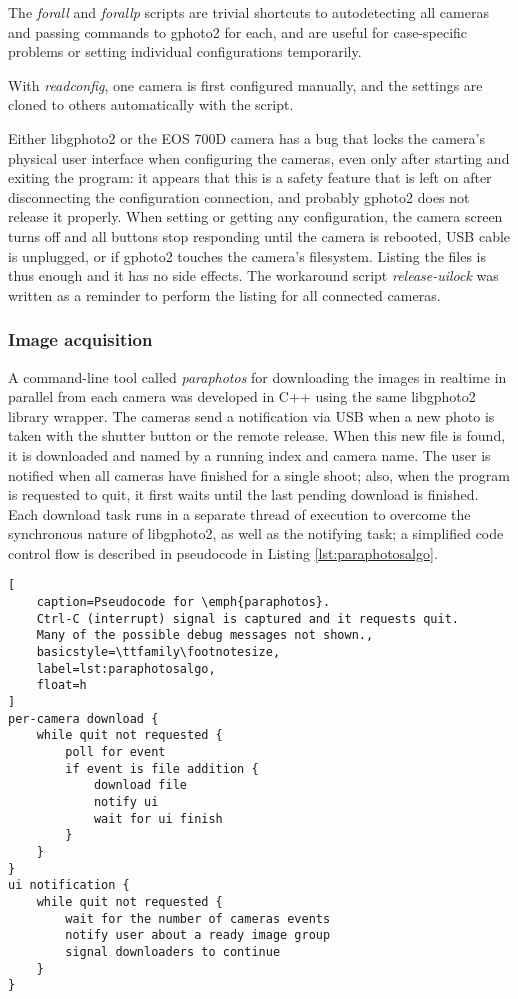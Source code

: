 The \emph{forall} and \emph{forallp} scripts are trivial shortcuts to autodetecting all cameras and passing commands to gphoto2 for each, and are useful for case-specific problems or setting individual configurations temporarily.

With \emph{readconfig}, one camera is first configured manually, and the settings are cloned to others automatically with the script.

Either libgphoto2 or the EOS 700D camera has a bug that locks the camera's physical user interface when configuring the cameras, even only after starting and exiting the program:
it appears that this is a safety feature that is left on after disconnecting the configuration connection, and probably gphoto2 does not release it properly.
When setting or getting any configuration, the camera screen turns off and all buttons stop responding until the camera is rebooted, USB cable is unplugged, or if gphoto2 touches the camera's filesystem.
Listing the files is thus enough and it has no side effects.
The workaround script \emph{release-uilock} was written as a reminder to perform the listing for all connected cameras.


\subsubsection{Image acquisition} %


A command-line tool called \emph{paraphotos} for downloading the images in realtime in parallel from each camera was developed in C++ using the same libgphoto2 library wrapper.
The cameras send a notification via USB when a new photo is taken with the shutter button or the remote release.
When this new file is found, it is downloaded and named by a running index and camera name.
The user is notified when all cameras have finished for a single shoot;
also, when the program is requested to quit, it first waits until the last pending download is finished.
Each download task runs in a separate thread of execution to overcome the synchronous nature of libgphoto2, as well as the notifying task; a simplified code control flow is described in pseudocode in Listing \ref{lst:paraphotosalgo}.

\begin{lstlisting}[
	caption=Pseudocode for \emph{paraphotos}.
	Ctrl-C (interrupt) signal is captured and it requests quit.
	Many of the possible debug messages not shown.,
	basicstyle=\ttfamily\footnotesize,
	label=lst:paraphotosalgo,
	float=h
]
per-camera download {
	while quit not requested {
		poll for event
		if event is file addition {
			download file
			notify ui
			wait for ui finish
		}
	}
}
ui notification {
	while quit not requested {
		wait for the number of cameras events
		notify user about a ready image group
		signal downloaders to continue
	}
}
\end{lstlisting}


